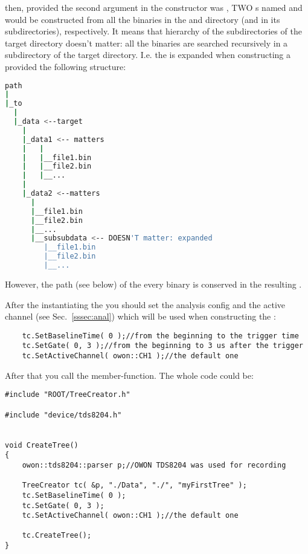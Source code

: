 then, provided the second argument in the  constructor
was , TWO s named  and
 would be constructed from all the binaries in the  and
 directory (and in its subdirectories), respectively.
It means that hierarchy of the subdirectories of the target directory doesn't matter:
all the binaries are searched recursively in a subdirectory of the target directory. I.e.
the  is expanded when constructing a  provided the following
structure:
\begin{lstlisting}[language=bash]
path
|
|_to
  |
  |_data <--target
    |
    |_data1 <-- matters
    |   | 
    |   |__file1.bin
    |   |__file2.bin
    |   |__...
    |
    |_data2 <--matters
      |
      |__file1.bin
      |__file2.bin
      |__...
      |__subsubdata <-- DOESN'T matter: expanded
         |__file1.bin
         |__file2.bin
         |__...
\end{lstlisting}
However, the path (see below) of the every binary is conserved in the resulting
.

After the instantiating the  you should set the analysis config and
the active channel
(see Sec.~\ref{sssec:anal}) which will be used when constructing the :
\begin{lstlisting}
    tc.SetBaselineTime( 0 );//from the beginning to the trigger time
    tc.SetGate( 0, 3 );//from the beginning to 3 us after the trigger
    tc.SetActiveChannel( owon::CH1 );//the default one
\end{lstlisting}


After that you call the  member-function. The whole code could be:

\begin{lstlisting}
#include "ROOT/TreeCreator.h"

#include "device/tds8204.h"


void CreateTree()
{
    owon::tds8204::parser p;//OWON TDS8204 was used for recording

    TreeCreator tc( &p, "./Data", "./", "myFirstTree" );
    tc.SetBaselineTime( 0 );
    tc.SetGate( 0, 3 );
    tc.SetActiveChannel( owon::CH1 );//the default one

    tc.CreateTree();
}
\end{lstlisting}

